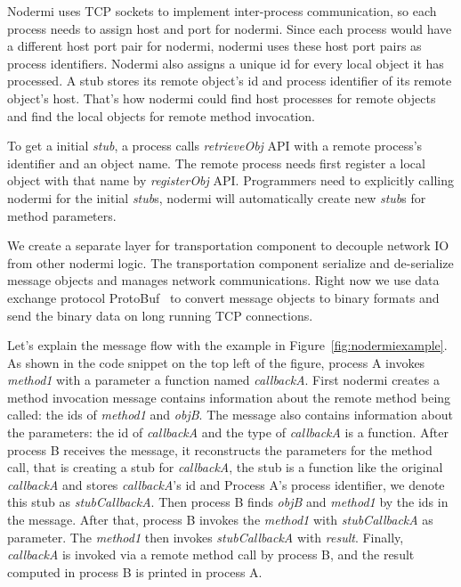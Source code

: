 Nodermi uses TCP sockets to implement inter-process communication,
so each process needs to assign host and port for nodermi.
Since each process would have a different host port pair for nodermi,
nodermi uses these host port pairs as process identifiers.
Nodermi also assigns a unique id for every local object it has processed.
A stub stores its remote object's id and process identifier of its remote object's host.
That's how nodermi could find host processes for remote objects and
find the local objects for remote method invocation.

To get a initial \emph{stub}, a process 
calls \emph{retrieveObj} API with a remote process's identifier and 
an object name.
The remote process needs first register a local object with that name by
\emph{registerObj} API.
Programmers need to explicitly calling nodermi for the initial \emph{stub}s,
nodermi will automatically create new \emph{stub}s for method parameters.


We create a separate layer for transportation component to decouple network
IO from other nodermi logic.
The transportation component serialize and de-serialize message objects
and manages network communications.
Right now we use data exchange protocol ProtoBuf~\cite{protobuf} to convert message objects to binary
formats and send the binary data on long running TCP connections.

Let's explain the message flow with the example 
in Figure~\ref{fig:nodermiexample}.
As shown in the code snippet on the top left of the figure,
process A invokes \emph{method1} with a parameter a function named \emph{callbackA}.
First nodermi creates a method invocation message
contains information about the remote method being called:
the ids of \emph{method1} and \emph{objB}.
The message also contains information about the parameters:
the id of \emph{callbackA} and the type of \emph{callbackA} is a function.
After process B receives the message,
it reconstructs the parameters for the method call,
that is creating a stub for \emph{callbackA},
the stub is a function like the original \emph{callbackA} and 
stores \emph{callbackA}'s id and Process A's process identifier,
we denote this stub as \emph{stubCallbackA}.
Then process B finds \emph{objB} and \emph{method1} by the ids in the message.
After that,
process B invokes the \emph{method1} with \emph{stubCallbackA} as parameter.
The \emph{method1} then invokes \emph{stubCallbackA} with \emph{result}.
Finally, \emph{callbackA} is invoked
via a remote method call by process B,
and the result computed in process B is printed in process A.


